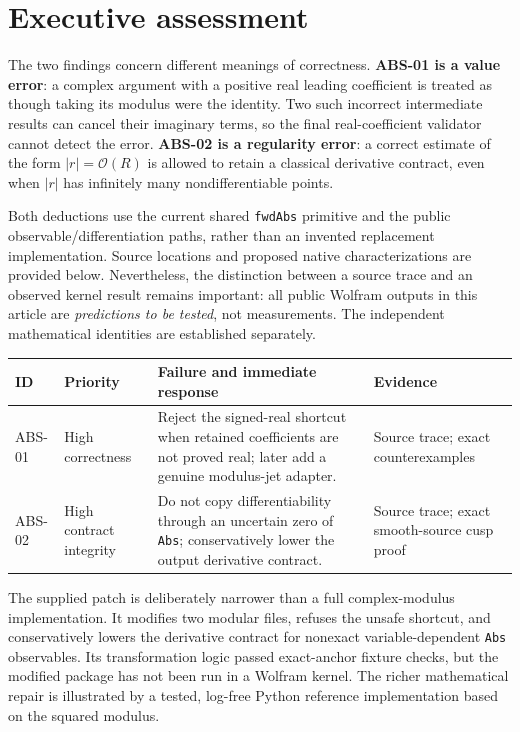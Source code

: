 \documentclass[11pt,a4paper]{article}
\newcommand{\code}[1]{\nolinkurl{#1}}
\newcommand{\OO}{\mathcal O}
\begin{document}
\section{Executive assessment}

The two findings concern different meanings of correctness. \textbf{ABS-01 is a value error}: a complex argument with a positive real leading coefficient is treated as though taking its modulus were the identity. Two such incorrect intermediate results can cancel their imaginary terms, so the final real-coefficient validator cannot detect the error. \textbf{ABS-02 is a regularity error}: a correct estimate of the form $|r|=\OO(R)$ is allowed to retain a classical derivative contract, even when $|r|$ has infinitely many nondifferentiable points.

Both deductions use the current shared \code{fwdAbs} primitive and the public observable/differentiation paths, rather than an invented replacement implementation. Source locations and proposed native characterizations are provided below. Nevertheless, the distinction between a source trace and an observed kernel result remains important: all public Wolfram outputs in this article are \emph{predictions to be tested}, not measurements. The independent mathematical identities are established separately.

\begin{center}
\begin{tabular}{L{19mm}L{29mm}L{72mm}L{24mm}}
\toprule
ID & Priority & Failure and immediate response & Evidence\\
\midrule
ABS-01 & High correctness & Reject the signed-real shortcut when retained coefficients are not proved real; later add a genuine modulus-jet adapter. & Source trace; exact counterexamples\\[4pt]
ABS-02 & High contract integrity & Do not copy differentiability through an uncertain zero of \code{Abs}; conservatively lower the output derivative contract. & Source trace; exact smooth-source cusp proof\\
\bottomrule
\end{tabular}
\end{center}

The supplied patch is deliberately narrower than a full complex-modulus implementation. It modifies two modular files, refuses the unsafe shortcut, and conservatively lowers the derivative contract for nonexact variable-dependent \code{Abs} observables. Its transformation logic passed exact-anchor fixture checks, but the modified package has not been run in a Wolfram kernel. The richer mathematical repair is illustrated by a tested, log-free Python reference implementation based on the squared modulus.
\end{document}
